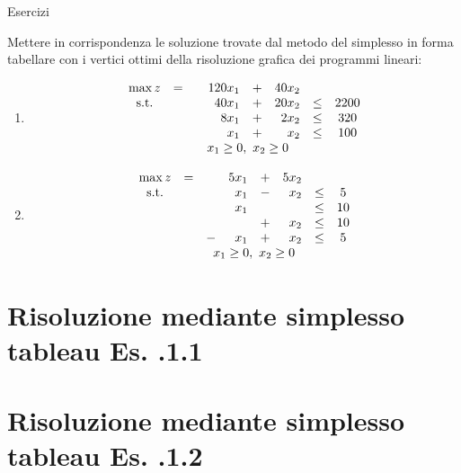 \documentclass{beamer}
\def\presentationtype{1}
\begin{document}
\generatitolo

\def\mixottimo{$$
\begin{array}{cccrcrcc}
	\max z		&=	& 	&120 x_{1}	&+&40 x_{2}\\
	\mbox{s.t.}	&	& 	&40 x_{1}	&+&20 x_{2}	&\leq	&2200\\
					&	& &8 x_{1}	&+&2 x_{2}	&\leq	&320\\
					&	& & x_{1}	&+& x_{2}	&\leq	&100\\
	&	&\multicolumn{4}{c}{x_{1} \geq 0,\ x_{2}\geq 0}
\end{array}
$$}

\def\rombo{$$
\begin{array}{cccrcrcc}
	\max z	&=	& 	&5 x_{1}	&+&5 x_{2}\\
	\mbox{s.t.}	&	& & x_{1}	&-& x_{2}	&\leq	& 5\\
				&	& & x_{1}	& &     	&\leq	&10\\
				&	& &			&+& x_{2}	&\leq	&10\\
				&	&-& x_{1}	&+& x_{2}	&\leq	& 5\\
	&	&\multicolumn{4}{c}{x_{1} \geq 0,\ x_{2}\geq 0}
\end{array}
$$}

\begin{frame}[allowframebreaks]{Esercizi}

{\footnotesize Mettere in corrispondenza le soluzione trovate dal metodo
	del simplesso in forma tabellare con i vertici ottimi della
	risoluzione grafica dei programmi lineari:

\begin{enumerate}
\item \mixottimo
\item \rombo
\end{enumerate}
}
\end{frame}

\section{Risoluzione mediante simplesso tableau Es. \nolezione.\presentationtype.1}



\section{Risoluzione mediante simplesso tableau Es. \nolezione.\presentationtype.2}

\end{document}
